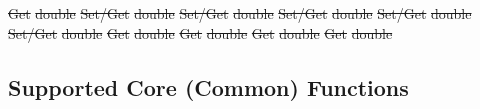 \documentclass[12pt]{report} %
\providecommand{\DIFdeltex}[1]{{\protect\color{red}\sout{#1}}}                      %
\providecommand{\DIFdelend}{} %
\providecommand{\DIFdel}[1]{\texorpdfstring{\DIFdeltex{#1}}{}} %
\DeclareRobustCommand{\DIFdelend}{\DIFOaddend \let\includegraphics\DIFOincludegraphics} %
\begin{document}
\DIFdel{Get }%
\DIFdel{double }%
\DIFdel{Set/Get }%
\DIFdel{double }%
\DIFdel{Set/Get }%
\DIFdel{double }%
\DIFdel{Set/Get }%
\DIFdel{double }%
\DIFdel{Set/Get }%
\DIFdel{double }%
\DIFdel{Set/Get }%
\DIFdel{double }%
\DIFdel{Get }%
\DIFdel{double }%
\DIFdel{Get }%
\DIFdel{double }%
\DIFdel{Get }%
\DIFdel{double }%
\DIFdel{Get }%
\DIFdel{double }%

\DIFdelend \subsection{Supported Core (Common) Functions}\label{sec:AppOSSupportedCommon}
\end{document}
